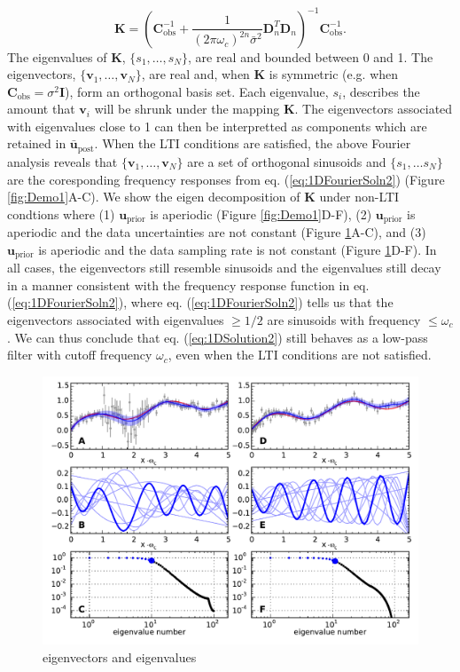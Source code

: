 \documentclass[10pt,a4paper]{article}
\begin{document}
\begin{equation}\label{eq:Kernel}
\mathbf{K} = (\mathbf{C}_\mathrm{obs}^{-1} + 
              \frac{1}{(2\pi\omega_c)^{2n}\bar{\sigma}^2}\mathbf{D}_n^T\mathbf{D}_n)^{-1}\mathbf{C}_\mathrm{obs}^{-1}.
\end{equation}
The eigenvalues of $\mathbf{K}$, $\{s_1, \dots, s_N\}$, are real and bounded between 0 and 1.  The eigenvectors, $\{\mathbf{v}_1, \dots,\mathbf{v}_N\}$, are real and, when $\mathbf{K}$ is symmetric (e.g. when $\mathbf{C}_\mathrm{obs} = \sigma^2 \mathbf{I}$), form an orthogonal basis set.  Each eigenvalue, $s_i$,  describes the amount that $\mathbf{v}_i$ will be shrunk under the mapping $\mathbf{K}$.  The eigenvectors associated with eigenvalues close to 1 can then be interpretted as components which are retained in $\mathbf{\bar{u}}_\mathrm{post}$. When the LTI conditions are satisfied, the above Fourier analysis reveals that $\{\mathbf{v}_1, \dots, \mathbf{v}_N\}$ are a set of orthogonal sinusoids and $\{s_1, \dots s_N\}$ are the coresponding frequency responses from eq. (\ref{eq:1DFourierSoln2}) (Figure \ref{fig:Demo1}A-C). We show the eigen decomposition of $\mathbf{K}$ under non-LTI condtions where (1) $\mathbf{u}_\mathrm{prior}$ is aperiodic (Figure \ref{fig:Demo1}D-F), (2) $\mathbf{u}_\mathrm{prior}$ is aperiodic and the data uncertainties are not constant (Figure \ref{fig:Demo2}A-C), and (3) $\mathbf{u}_\mathrm{prior}$ is aperiodic and the data sampling rate is not constant (Figure \ref{fig:Demo2}D-F). In all cases, the eigenvectors still resemble sinusoids and the eigenvalues still decay in a manner consistent with the frequency response function in eq. (\ref{eq:1DFourierSoln2}), where eq. (\ref{eq:1DFourierSoln2}) tells us that the eigenvectors associated with eigenvalues ${\geq}1/2$ are sinusoids with frequency ${\leq}\omega_c$. We can thus conclude that eq. (\ref{eq:1DSolution2}) still behaves as a low-pass filter with cutoff frequency $\omega_c$, even when the LTI conditions are not satisfied.  

\begin{figure}
\includegraphics[scale=1.0]{figures/figure3}
\caption{eigenvectors and eigenvalues}   
\label{fig:Demo2}
\end{figure}
\end{document}
